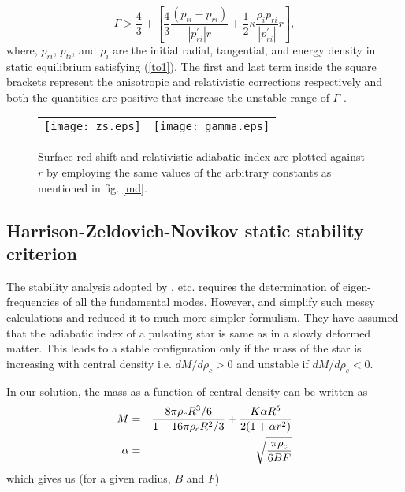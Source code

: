 \documentclass[preprintnumbers,amsmath,amssymb,floatfix,9pt,prd,twocolumn,
superscriptaddress,nofootinbib]{revtex4}
\begin{document}
\begin{equation}
\Gamma>\frac{4}{3}+\left[\frac{4}{3}\frac{(p_{ti}-p_{ri})}{|p_{ri}^\prime|r}+\frac{1}{2}\kappa\frac{\rho_ip_{ri}}{|p_{ri}^\prime|}r\right],
\end{equation}
where, $p_{ri}$, $p_{ti}$, and $\rho_i$ are the initial radial, tangential, and energy density in static equilibrium satisfying (\ref{to1}). The first and last term inside the square brackets represent the anisotropic and relativistic corrections respectively and both the quantities are positive that increase the unstable range of $\Gamma$ \citep{her1,chan}.


\begin{figure*}[thbp]
\begin{center}
\begin{tabular}{rl}
\texttt{[image: zs.eps]}&
\texttt{[image: gamma.eps]}\\
\end{tabular}
\end{center}
\caption{Surface red-shift and relativistic adiabatic index are plotted against $r$ by employing the same values of the arbitrary constants as mentioned in fig. \ref{md}.}\label{re}
\end{figure*}


\subsection{Harrison-Zeldovich-Novikov static stability criterion}

The stability analysis adopted by \cite{chan64}, \cite{har65} etc. requires the determination of eigen-frequencies of all the fundamental modes. However, \cite{har65} and \cite{zel} simplify such messy calculations and reduced it to much more simpler formulism. They have assumed that the adiabatic index of a pulsating star is same as in a slowly deformed matter. This leads to a stable configuration only if the mass of the star is increasing with central density i.e. $dM/d\rho_c > 0$ and unstable if $dM/d\rho_c < 0$.

In our solution, the mass as a function of central density can be written as
\begin{eqnarray*}
M &=& \frac{8\pi \rho_c R^{3}/6}{1+ 16\pi \rho_c R^2/3}+{K \alpha R^5 \over 2(1+\alpha r^2)}\\
\alpha&=&\sqrt{{\pi \rho_c \over 6BF}} \label{mrho1}
\end{eqnarray*}
which gives us (for a given radius, $B$ and $F$)
\end{document}
